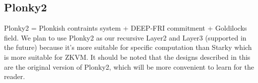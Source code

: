 \subsection{Plonky2} \label{sec:Plonky2}

Plonky2 \cite{website:plonky2} = Plonkish contraints system + DEEP-FRI commitment + Goldilocks field. We plan to use Plonky2 as our recursive Layer2 and Layer3 (supported in the future) because it's more suitable for specific computation than Starky which is more suitable for ZKVM. It should be noted that the designs described in this are the original version of Plonky2, which will be more convenient to learn for the reader.




